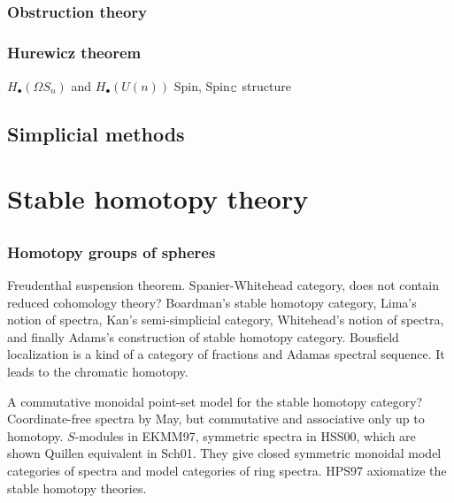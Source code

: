\documentclass{../../large}
\begin{document}
\chapter{}

\section{Obstruction theory}
\section{Hurewicz theorem}
$H_\bullet(\Omega S_n)$ and $H_\bullet(U(n))$
Spin, Spin$_{\mathbb{C}}$ structure




\chapter{Simplicial methods}














\part{Stable homotopy theory}


\chapter{}
\section{Homotopy groups of spheres}

Freudenthal suspension theorem.
Spanier-Whitehead category, does not contain reduced cohomology theory?
Boardman's stable homotopy category, Lima's notion of spectra, Kan's semi-simplicial category, Whitehead's notion of spectra, and finally Adams's construction of stable homotopy category.
Bousfield localization is a kind of a category of fractions and Adamas spectral sequence.
It leads to the chromatic homotopy.

A commutative monoidal point-set model for the stable homotopy category?
Coordinate-free spectra by May, but commutative and associative only up to homotopy.
$S$-modules in EKMM97, symmetric spectra in HSS00, which are shown Quillen equivalent in Sch01.
They give closed symmetric monoidal model categories of spectra and model categories of ring spectra.
HPS97 axiomatize the stable homotopy theories.
\end{document}
